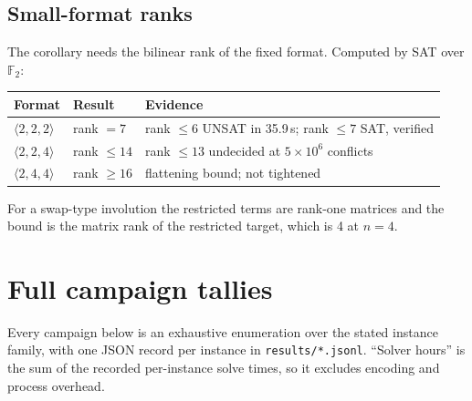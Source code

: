 \documentclass[11pt]{article}
\newcommand{\FF}{\mathbb{F}_2}
\newcommand{\tw}[3]{\langle #1,#2,#3\rangle}
\begin{document}
\subsection{Small-format ranks}

The corollary needs the bilinear rank of the fixed format. Computed by SAT over $\FF$:

\begin{center}
\begin{tabular}{lll}
\toprule
Format & Result & Evidence \\
\midrule
$\tw222$ & rank $= 7$ & rank $\leq 6$ UNSAT in 35.9\,s; rank $\leq 7$ SAT, verified \\
$\tw224$ & rank $\leq 14$ & rank $\leq 13$ undecided at $5\times10^{6}$ conflicts \\
$\tw244$ & rank $\geq 16$ & flattening bound; not tightened \\
\bottomrule
\end{tabular}
\end{center}

For a swap-type involution the restricted terms are rank-one matrices and the bound is the matrix rank of
the restricted target, which is 4 at $n=4$.

\section{Full campaign tallies}

Every campaign below is an exhaustive enumeration over the stated instance family, with one JSON record
per instance in \texttt{results/*.jsonl}. ``Solver hours'' is the sum of the recorded per-instance solve
times, so it excludes encoding and process overhead.
\end{document}
